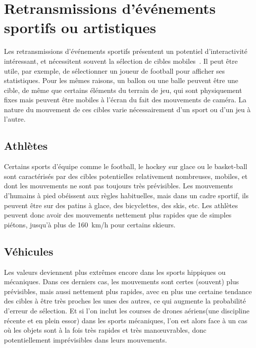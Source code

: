 	\section{Retransmissions d'événements sportifs ou artistiques}
	Les retransmissions d'événements sportifs présentent un potentiel d'interactivité intéressant, et nécessitent souvent la sélection de cibles mobiles~\cite{ilich2010moving}. Il peut être utile, par exemple, de sélectionner un joueur de football pour afficher ses statistiques. Pour les mêmes raisons, un ballon ou une balle peuvent être une cible, de même que certains éléments du terrain de jeu, qui sont physiquement fixes mais peuvent être mobiles à l'écran du fait des mouvements de caméra. La nature du mouvement de ces cibles varie nécessairement d'un sport ou d'un jeu à l'autre.
	
	\subsection{Athlètes}
	Certains sports d'équipe comme le football, le hockey sur glace ou le basket-ball sont caractérisés par des cibles potentielles relativement nombreuses, mobiles, et dont les mouvements ne sont pas toujours très prévisibles. Les mouvements d'humains à pied obéissent aux règles habituelles, mais dans un cadre sportif, ils peuvent être sur des patins à glace, des bicyclettes, des skis, etc. Les athlètes peuvent donc avoir des mouvements nettement plus rapides que de simples piétons, jusqu'à plus de 160~km/h pour certains skieurs\footnotemark.
	
	
	\subsection{Véhicules}
	Les valeurs deviennent plus extrêmes encore dans les sports hippiques ou mécaniques. Dans ces derniers cas, les mouvements sont certes (souvent) plus prévisibles, mais aussi nettement plus rapides, avec en plus une certaine tendance des cibles à être très proches les unes des autres, ce qui augmente la probabilité d'erreur de sélection. Et si l'on inclut les courses de drones aériens\footnotemark (une discipline récente et en plein essor) dans les sports mécaniques, l'on est alors face à un cas où les objets sont à la fois très rapides et très manœuvrables, donc potentiellement imprévisibles dans leurs mouvements.
	
